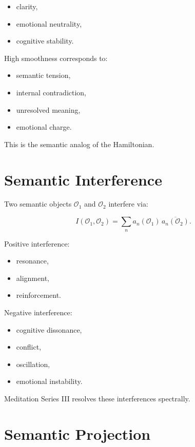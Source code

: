 \documentclass[12pt]{article}
\begin{document}
\begin{itemize}
\item clarity,
\item emotional neutrality,
\item cognitive stability.
\end{itemize}

High smoothness corresponds to:

\begin{itemize}
\item semantic tension,
\item internal contradiction,
\item unresolved meaning,
\item emotional charge.
\end{itemize}

This is the semantic analog of the Hamiltonian.

\section{Semantic Interference}

Two semantic objects $\mathcal{O}_1$ and $\mathcal{O}_2$ interfere via:

\[
I(\mathcal{O}_1,\mathcal{O}_2)
    = \sum_n a_n(\mathcal{O}_1)\,\overline{a_n(\mathcal{O}_2)}.
\]

Positive interference:

\begin{itemize}
\item resonance,
\item alignment,
\item reinforcement.
\end{itemize}

Negative interference:

\begin{itemize}
\item cognitive dissonance,
\item conflict,
\item oscillation,
\item emotional instability.
\end{itemize}

Meditation Series III resolves these interferences spectrally.

\section{Semantic Projection}
\end{document}
